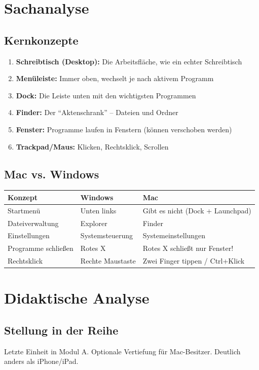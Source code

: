 \documentclass[11pt,a4paper]{article}
\begin{document}
\section{Sachanalyse}

\subsection{Kernkonzepte}
\begin{enumerate}
    \item \textbf{Schreibtisch (Desktop):} Die Arbeitsfläche, wie ein echter Schreibtisch
    \item \textbf{Menüleiste:} Immer oben, wechselt je nach aktivem Programm
    \item \textbf{Dock:} Die Leiste unten mit den wichtigsten Programmen
    \item \textbf{Finder:} Der ``Aktenschrank'' -- Dateien und Ordner
    \item \textbf{Fenster:} Programme laufen in Fenstern (können verschoben werden)
    \item \textbf{Trackpad/Maus:} Klicken, Rechtsklick, Scrollen
\end{enumerate}

\subsection{Mac vs. Windows}
\begin{tabular}{|l|l|l|}
\hline
\textbf{Konzept} & \textbf{Windows} & \textbf{Mac} \\
\hline
Startmenü & Unten links & Gibt es nicht (Dock + Launchpad) \\
Dateiverwaltung & Explorer & Finder \\
Einstellungen & Systemsteuerung & Systemeinstellungen \\
Programme schließen & Rotes X & Rotes X schließt nur Fenster! \\
Rechtsklick & Rechte Maustaste & Zwei Finger tippen / Ctrl+Klick \\
\hline
\end{tabular}

\section{Didaktische Analyse}

\subsection{Stellung in der Reihe}
Letzte Einheit in Modul A. Optionale Vertiefung für Mac-Besitzer. Deutlich anders als iPhone/iPad.
\end{document}
